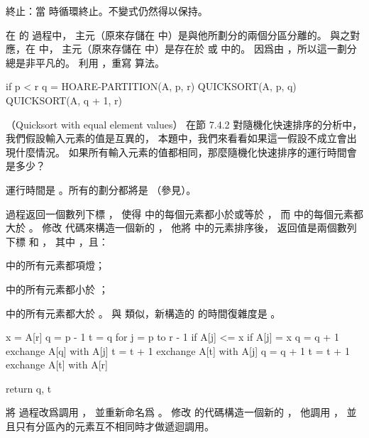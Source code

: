 {\EMP 終止：}當  時循環終止。不變式仍然得以保持。
\stopANSWER

\stopigBase

在 的  過程中，
主元（原來存儲在  中）是與他所劃分的兩個分區分離的。
與之對應，在  中，
主元（原來存儲在  中）是存在於  或  中的。
因爲由 ，所以這一劃分總是非平凡的。
\startigBase[a,continue]
\startitem
利用 ，重寫  算法。
\stopitem

\startANSWER
{}
\startCLRS
if p < r
	q = HOARE-PARTITION(A, p, r)
	QUICKSORT(A, p, q)
	QUICKSORT(A, q + 1, r)
\stopCLRS
\stopANSWER
\stopigBase
\stopPROBLEM

（Quicksort with equal element values）
在節 7.4.2 對隨機化快速排序的分析中，
我們假設輸入元素的值是互異的，
本題中，我們來看看如果這一假設不成立會出現什麼情況。
\startigBase[a]
\startitem
如果所有輸入元素的值都相同，那麼隨機化快速排序的運行時間會是多少？
\stopitem

\startANSWER
運行時間是 。所有的劃分都將是  （參見）。
\stopANSWER

\startitem
{} 過程返回一個數列下標 ，
使得  中的每個元素都小於或等於 ，
而  中的每個元素都大於 。
修改  代碼來構造一個新的 ，
他將  中的元素排序後，
返回值是兩個數列下標  和 ，
其中 ，且：
\startigBase[a]
\item {} 中的所有元素都項燈；
\item {} 中的所有元素都小於 ；
\item {} 中的所有元素都大於 。
\stopigBase
與  類似，新構造的  的時間復雜度是 。
\stopitem

\startANSWER
{}
\startCLRS
x = A[r]
q = p - 1
t = q
for j = p to r - 1
	if A[j] <= x
		if A[j] = x
			q = q + 1
			exchange A[q] with A[j]
		t = t + 1
		exchange A[t] with A[j]
q = q + 1
t = t + 1
exchange A[t] with A[r]

return q, t
\stopCLRS
\stopANSWER

\startitem
將  過程改爲調用 ，
並重新命名爲 。
修改  的代碼構造一個新的 ，
他調用 ，
並且只有分區內的元素互不相同時才做遞迴調用。
\stopitem

